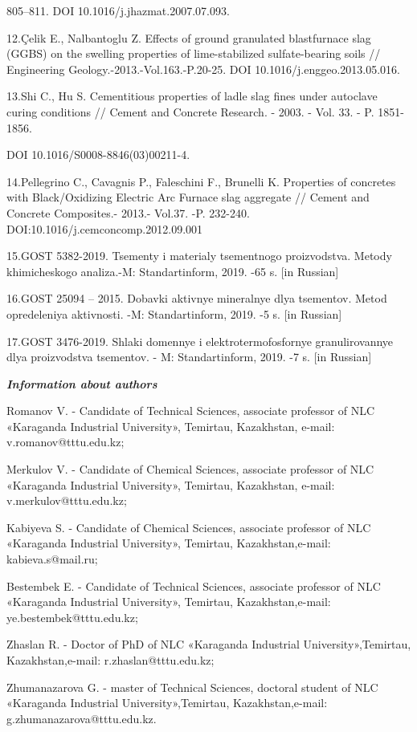 805--811. DOI 10.1016/j.jhazmat.2007.07.093.

12.Çelik E., Nalbantoglu Z. Effects of ground granulated blastfurnace
slag (GGBS) on the swelling properties of lime-stabilized
sulfate-bearing soils // Engineering Geology.-2013.-Vol.163.-P.20-25.
DOI 10.1016/j.enggeo.2013.05.016.

13.Shi C., Hu S. Cementitious properties of ladle slag fines under
autoclave curing conditions // Cement and Concrete Research. - 2003. -
Vol. 33. - P. 1851-1856.

DOI 10.1016/S0008-8846(03)00211-4.

14.Pellegrino C., Cavagnis P., Faleschini F., Brunelli K. Properties of
concretes with Black/Oxidizing Electric Arc Furnace slag aggregate //
Cement and Concrete Composites.- 2013.- Vol.37. -P. 232-240.
DOI:10.1016/j.cemconcomp.2012.09.001

15.GOST 5382-2019. Tsementy i materialy tsementnogo proizvodstva. Metody
khimicheskogo analiza.-M: Standartinform, 2019. -65 s. {[}in Russian{]}

16.GOST 25094 -- 2015. Dobavki aktivnye mineral\textquotesingle nye dlya
tsementov. Metod opredeleniya aktivnosti. -M: Standartinform, 2019. -5
s. {[}in Russian{]}

17.GOST 3476-2019. Shlaki domennye i elektrotermofosfornye
granulirovannye dlya proizvodstva tsementov. - M: Standartinform, 2019.
-7 s. {[}in Russian{]}

\emph{{\bfseries Information about authors}}

Romanov V. - Candidate of Technical Sciences, associate professor of NLC
«Karaganda Industrial University», Temirtau, Kazakhstan, e-mail:
v.romanov@tttu.edu.kz;

Merkulov V. - Candidate of Chemical Sciences, associate professor of NLC
«Karaganda Industrial University», Temirtau, Kazakhstan, e-mail:
v.merkulov@tttu.edu.kz;

Kabiyeva S. - Candidate of Chemical Sciences, associate professor of NLC
«Karaganda Industrial University», Temirtau, Kazakhstan,e-mail:
kabieva.s@mail.ru;

Bestembek E. - Candidate of Technical Sciences, associate professor of
NLC «Karaganda Industrial University», Temirtau, Kazakhstan,e-mail:
ye.bestembek@tttu.edu.kz;

Zhaslan R. - Doctor of PhD of NLC «Karaganda Industrial
University»,Temirtau, Kazakhstan,e-mail: r.zhaslan@tttu.edu.kz;

Zhumanazarova G. - master of Technical Sciences, doctoral student of NLC
«Karaganda Industrial University»,Temirtau, Kazakhstan,e-mail:
g.zhumanazarova@tttu.edu.kz.

